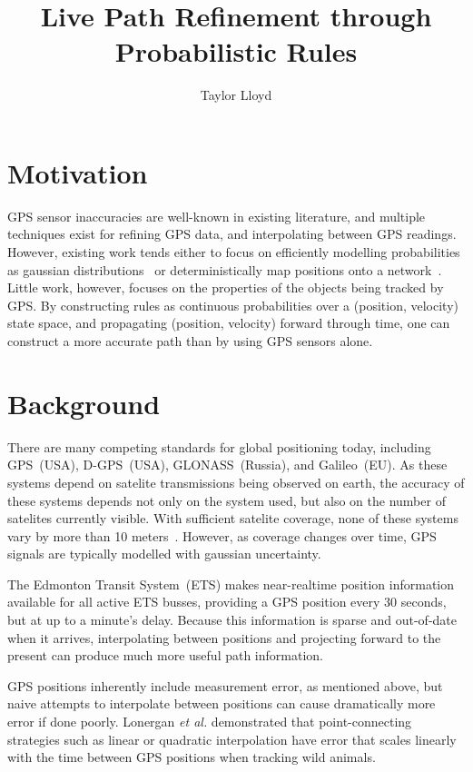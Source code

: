 \documentclass{article}
\begin{document}
\title{Live Path Refinement through Probabilistic Rules}
\author{Taylor Lloyd}

\maketitle

\section{Motivation}
    GPS sensor inaccuracies are well-known in existing literature, and multiple techniques exist for refining GPS data, and interpolating between GPS readings.
    However, existing work tends either to focus on efficiently modelling probabilities as gaussian distributions~\cite{kobayashiITIE98} or deterministically map positions onto a network~\cite{brakatsoulasVLDB05}.
    Little work, however, focuses on the properties of the objects being tracked by GPS. By constructing rules as continuous probabilities over a (position, velocity) state space, and propagating (position, velocity) forward through time, one can construct a more accurate path than by using GPS sensors alone.

\section{Background}

    There are many competing standards for global positioning today, including GPS~(USA), D-GPS~(USA), GLONASS~(Russia), and Galileo~(EU). As these systems depend on satelite transmissions being observed on earth, the accuracy of these systems depends not only on the system used, but also on the number of satelites currently visible. With sufficient satelite coverage, none of these systems vary by more than 10 meters~\cite{liJG15}. However, as coverage changes over time, GPS signals are typically modelled with gaussian uncertainty.

    The Edmonton Transit System~(ETS) makes near-realtime position information available for all active ETS busses, providing a GPS position every 30 seconds, but at up to a minute's delay.
    Because this information is sparse and out-of-date when it arrives, interpolating between positions and projecting forward to the present can produce much more useful path information.

  GPS positions inherently include measurement error, as mentioned above, but naive attempts to interpolate between positions can cause dramatically more error if done poorly. Lonergan \textit{et al.} demonstrated that point-connecting strategies such as linear or quadratic interpolation have error that scales linearly with the time between GPS positions when tracking wild animals.
\end{document}
